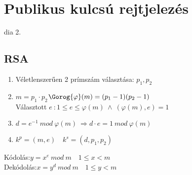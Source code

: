 \section{Publikus kulcsú rejtjelezés }
dia 2.

\subsection{RSA} %

	\begin{enumerate}
		\item Véletlenszerűen 2 prímszám választása: $p_1,p_2$
		\item $m = p_1 \cdot p_2$\quad $ \Gorog{ \varphi }(m) = (p_1-1)(p_2-1)$\\[2pt]
		Választott $e\ : 1\leq e \leq \varphi(m) \ \land \ (\varphi(m),e) = 1$
		\item $d = e^{-1} \ mod \ \varphi(m) \ \Longrightarrow d\cdot e = 1 \ mod \ \varphi(m)$
		\item $k^p = (m,e) \quad k^s = (d,p_1,p_2) $
	\end{enumerate}

	Kódolás:\quad $y = x^e \ mod\ m \quad 1 \leq x < m$\\[2pt]
	Dekódolás:\quad $x = y^d \ mod\ m \quad 1 \leq y < m$

